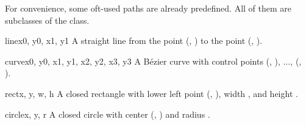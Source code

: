 \label{path:predefined}

For convenience, some oft-used paths are already predefined. All
of them are subclasses of the  class. 

\begin{classdesc}{line}{x0, y0, x1, y1}
A straight line from the point (, ) to the point (, ). 
\end{classdesc}

\begin{classdesc}{curve}{x0, y0, x1, y1, x2, y2, x3, y3}
A B\'ezier curve with 
control points  (, ), $\dots$, (, ).\
\end{classdesc}

\begin{classdesc}{rect}{x, y, w, h}
A closed rectangle with lower left point (, ), width , and
  height \var{h}. 
\end{classdesc}

\begin{classdesc}{circle}{x, y, r}
A closed circle with center (, ) and radius . 
\end{classdesc}

